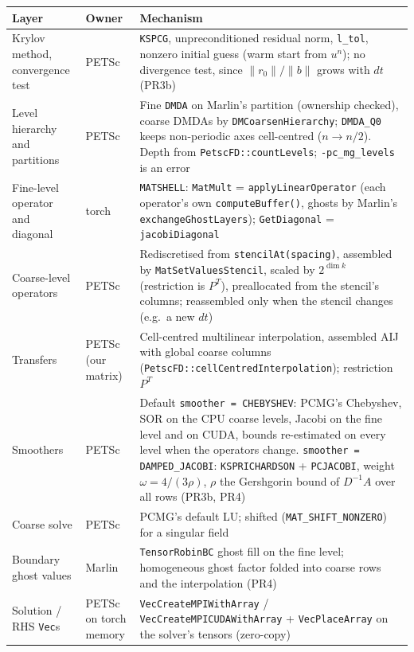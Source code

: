 \documentclass[11pt]{article}
\begin{document}
\begin{longtable}{p{} p{} p{}}
\toprule
Layer & Owner & Mechanism \\
\midrule
\endhead
Krylov method, convergence test & PETSc & \texttt{KSPCG}, unpreconditioned residual norm, \texttt{l\_tol}, nonzero initial guess (warm start from $u^n$); no divergence test, since $\|r_0\|/\|b\|$ grows with $dt$ (PR3b) \\
Level hierarchy and partitions & PETSc & Fine \texttt{DMDA} on Marlin's partition (ownership checked), coarse DMDAs by \texttt{DMCoarsenHierarchy}; \texttt{DMDA\_Q0} keeps non-periodic axes cell-centred ($n \to n/2$). Depth from \texttt{PetscFD::countLevels}; \texttt{-pc\_mg\_levels} is an error \\
Fine-level operator and diagonal & torch & \texttt{MATSHELL}: \texttt{MatMult} = \texttt{applyLinearOperator} (each operator's own \texttt{computeBuffer()}, ghosts by Marlin's \texttt{exchangeGhostLayers}); \texttt{GetDiagonal} = \texttt{jacobiDiagonal} \\
Coarse-level operators & PETSc & Rediscretised from \texttt{stencilAt(spacing)}, assembled by \texttt{MatSetValuesStencil}, scaled by $2^{\dim k}$ (restriction is $P^T$), preallocated from the stencil's columns; reassembled only when the stencil changes (e.g.\ a new $dt$) \\
Transfers & PETSc (our matrix) & Cell-centred multilinear interpolation, assembled AIJ with global coarse columns (\texttt{PetscFD::cellCentredInterpolation}); restriction $P^T$ \\
Smoothers & PETSc & Default \texttt{smoother = CHEBYSHEV}: PCMG's Chebyshev, SOR on the CPU coarse levels, Jacobi on the fine level and on CUDA, bounds re-estimated on every level when the operators change. \texttt{smoother = DAMPED\_JACOBI}: \texttt{KSPRICHARDSON} + \texttt{PCJACOBI}, weight $\omega = 4/(3\rho)$, $\rho$ the Gershgorin bound of $D^{-1}A$ over all rows (PR3b, PR4) \\
Coarse solve & PETSc & PCMG's default LU; shifted (\texttt{MAT\_SHIFT\_NONZERO}) for a singular field \\
Boundary ghost values & Marlin & \texttt{TensorRobinBC} ghost fill on the fine level; homogeneous ghost factor folded into coarse rows and the interpolation (PR4) \\
Solution / RHS \texttt{Vec}s & PETSc on torch memory & \texttt{VecCreateMPIWithArray} / \texttt{VecCreateMPICUDAWithArray} + \texttt{VecPlaceArray} on the solver's tensors (zero-copy) \\
\bottomrule
\end{longtable}
\end{document}
